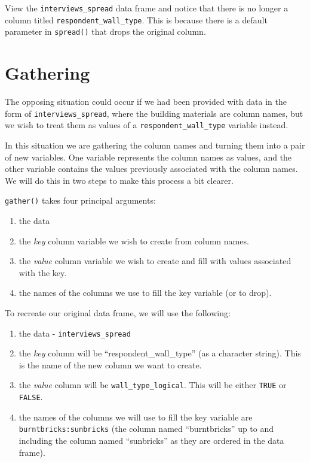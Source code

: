\documentclass[]{book}
\providecommand{\tightlist}{%
  \setlength{\itemsep}{0pt}\setlength{\parskip}{0pt}}
\begin{document}
View the \texttt{interviews\_spread} data frame and notice that there is
no longer a column titled \texttt{respondent\_wall\_type}. This is
because there is a default parameter in \texttt{spread()} that drops the
original column.

\section{Gathering}\label{gathering}

The opposing situation could occur if we had been provided with data in
the form of \texttt{interviews\_spread}, where the building materials
are column names, but we wish to treat them as values of a
\texttt{respondent\_wall\_type} variable instead.

In this situation we are gathering the column names and turning them
into a pair of new variables. One variable represents the column names
as values, and the other variable contains the values previously
associated with the column names. We will do this in two steps to make
this process a bit clearer.

\texttt{gather()} takes four principal arguments:

\begin{enumerate}
\def\labelenumi{\arabic{enumi}.}
\tightlist
\item
  the data
\item
  the \emph{key} column variable we wish to create from column names.
\item
  the \emph{value} column variable we wish to create and fill with
  values associated with the key.
\item
  the names of the columns we use to fill the key variable (or to drop).
\end{enumerate}

To recreate our original data frame, we will use the following:

\begin{enumerate}
\def\labelenumi{\arabic{enumi}.}
\tightlist
\item
  the data - \texttt{interviews\_spread}
\item
  the \emph{key} column will be ``respondent\_wall\_type'' (as a
  character string). This is the name of the new column we want to
  create.
\item
  the \emph{value} column will be \texttt{wall\_type\_logical}. This
  will be either \texttt{TRUE} or \texttt{FALSE}.
\item
  the names of the columns we will use to fill the key variable are
  \texttt{burntbricks:sunbricks} (the column named ``burntbricks'' up to
  and including the column named ``sunbricks'' as they are ordered in
  the data frame).
\end{enumerate}
\end{document}
